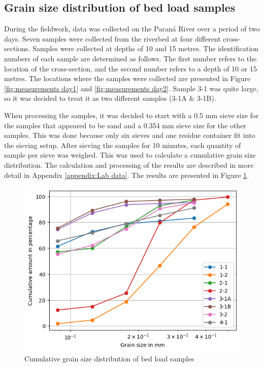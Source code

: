 \subsection{Grain size distribution of bed load samples}
\label{sec:grainsizedistribution}
During the fieldwork, data was collected on the Paraná River over a period of two days. Seven samples were collected from the riverbed at four different cross-sections. Samples were collected at depths of 10 and 15 metres. The identification numbers of each sample are determined as follows. The first number refers to the location of the cross-section, and the second number refers to a depth of 10 or 15 metres. The locations where the samples were collected are presented in Figure \ref{fig:measurements day1} and \ref{fig:measurements day2}. Sample 3-1 was quite large, so it was decided to treat it as two different samples (3-1A \& 3-1B). 

When processing the samples, it was decided to start with a 0.5 mm sieve size for the samples that appeared to be sand and a 0.354 mm sieve size for the other samples. This was done because only six sieves and one residue container fit into the sieving setup. After sieving the samples for 10 minutes, each quantity of sample per sieve was weighed. This was used to calculate a cumulative grain size distribution. The calculation and processing of the results are  described in more detail in Appendix \ref{appendix:Lab data}. The results are presented in Figure \ref{fig:Cumu}.


\begin{figure}[H]
    \centering
    \includegraphics[width=0.75\linewidth]{figures//ch6/CUMU.png}
    \caption{Cumulative grain size distribution of bed load samples}
    \label{fig:Cumu}
\end{figure}

